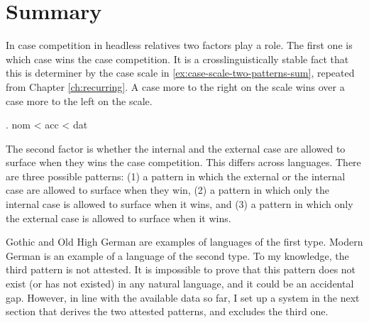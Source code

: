 \section{Summary}\label{sec:summary-2-patterns}

In case competition in headless relatives two factors play a role. The first one is which case wins the case competition. It is a crosslinguistically stable fact that this is determiner by the case scale in \ref{ex:case-scale-two-patterns-sum}, repeated from Chapter \ref{ch:recurring}. A case more to the right on the scale wins over a case more to the left on the scale.

\ex. \ac{nom} < \ac{acc} < \ac{dat}\label{ex:case-scale-two-patterns-sum}

The second factor is whether the internal and the external case are allowed to surface when they wins the case competition. This differs across languages. There are three possible patterns: (1) a pattern in which the external or the internal case are allowed to surface when they win, (2) a pattern in which only the internal case is allowed to surface when it wins, and (3) a pattern in which only the external case is allowed to surface when it wins.

Gothic and Old High German are examples of languages of the first type. Modern German is an example of a language of the second type. To my knowledge, the third pattern is not attested. It is impossible to prove that this pattern does not exist (or has not existed) in any natural language, and it could be an accidental gap. However, in line with the available data so far, I set up a system in the next section that derives the two attested patterns, and excludes the third one.
